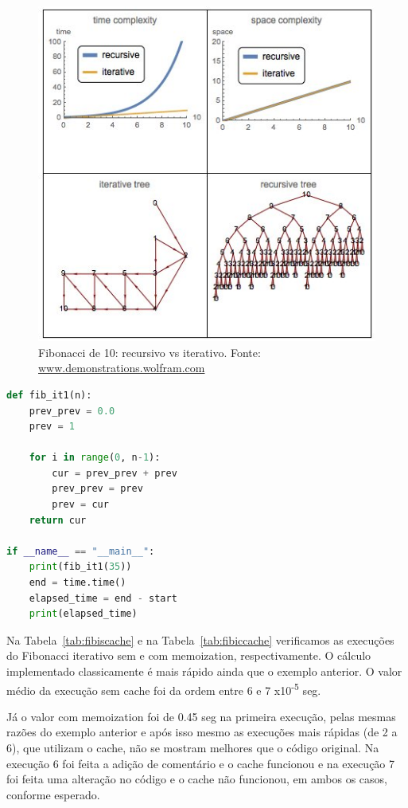 \documentclass[sigconf]{acmart}
\begin{document}
\begin{figure}[H]
  \centering
  \includegraphics[width=\linewidth]{fib_10_rec_vs_it}
  \caption{Fibonacci de 10: recursivo vs iterativo. \newline Fonte: \url{www.demonstrations.wolfram.com}}
\end{figure}

\renewcommand{\lstlistingname}{Trecho de código}
\begin{lstlisting}[language=Python, caption=Sequência de Fibonacci iterativa com memoization]
def fib_it1(n):
	prev_prev = 0.0
	prev = 1

	for i in range(0, n-1):
		cur = prev_prev + prev
		prev_prev = prev
		prev = cur
	return cur

if __name__ == "__main__":   
    print(fib_it1(35))
    end = time.time()
    elapsed_time = end - start
    print(elapsed_time)
\end{lstlisting}

Na Tabela~\ref{tab:fibiscache} e na Tabela~\ref{tab:fibiccache} verificamos as execuções do Fibonacci iterativo sem e com memoization, respectivamente. O cálculo implementado classicamente é mais rápido ainda que o exemplo anterior. O valor médio da execução sem cache foi da ordem entre 6 e 7 x10\textsuperscript{-5} seg.

Já o valor com memoization foi de 0.45 seg na primeira execução, pelas mesmas razões do exemplo anterior e após isso mesmo as execuções mais rápidas (de 2 a 6), que utilizam o cache, não se mostram melhores que o código original. Na execução 6 foi feita a adição de comentário e o cache funcionou e na execução 7 foi feita uma alteração no código e o cache não funcionou, em ambos os casos, conforme esperado.
\end{document}
